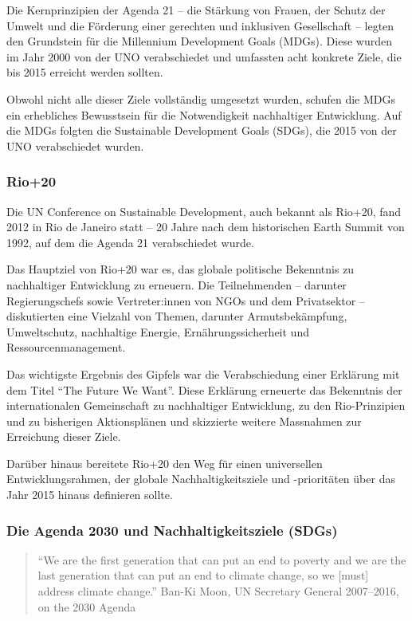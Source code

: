 \documentclass[
  letterpaper,
  DIV=11,
  numbers=noendperiod]{scrartcl}
\begin{document}
Die Kernprinzipien der Agenda 21 -- die Stärkung von Frauen, der Schutz
der Umwelt und die Förderung einer gerechten und inklusiven Gesellschaft
-- legten den Grundstein für die Millennium Development Goals (MDGs).
Diese wurden im Jahr 2000 von der UNO verabschiedet und umfassten acht
konkrete Ziele, die bis 2015 erreicht werden sollten.

Obwohl nicht alle dieser Ziele vollständig umgesetzt wurden, schufen die
MDGs ein erhebliches Bewusstsein für die Notwendigkeit nachhaltiger
Entwicklung. Auf die MDGs folgten die Sustainable Development Goals
(SDGs), die 2015 von der UNO verabschiedet wurden.

\subsubsection{Rio+20}\label{rio20}

Die UN Conference on Sustainable Development, auch bekannt als Rio+20,
fand 2012 in Rio de Janeiro statt -- 20 Jahre nach dem historischen
Earth Summit von 1992, auf dem die Agenda 21 verabschiedet wurde.

Das Hauptziel von Rio+20 war es, das globale politische Bekenntnis zu
nachhaltiger Entwicklung zu erneuern. Die Teilnehmenden -- darunter
Regierungschefs sowie Vertreter:innen von NGOs und dem Privatsektor --
diskutierten eine Vielzahl von Themen, darunter Armutsbekämpfung,
Umweltschutz, nachhaltige Energie, Ernährungssicherheit und
Ressourcenmanagement.

Das wichtigste Ergebnis des Gipfels war die Verabschiedung einer
Erklärung mit dem Titel ``The Future We Want''. Diese Erklärung
erneuerte das Bekenntnis der internationalen Gemeinschaft zu
nachhaltiger Entwicklung, zu den Rio-Prinzipien und zu bisherigen
Aktionsplänen und skizzierte weitere Massnahmen zur Erreichung dieser
Ziele.

Darüber hinaus bereitete Rio+20 den Weg für einen universellen
Entwicklungsrahmen, der globale Nachhaltigkeitsziele und -prioritäten
über das Jahr 2015 hinaus definieren sollte.

\subsubsection{Die Agenda 2030 und Nachhaltigkeitsziele
(SDGs)}\label{die-agenda-2030-und-nachhaltigkeitsziele-sdgs}

\begin{quote}
``We are the first generation that can put an end to poverty and we are
the last generation that can put an end to climate change, so we
{[}must{]} address climate change.'' Ban-Ki Moon, UN Secretary General
2007--2016, on the 2030 Agenda
\end{quote}
\end{document}
